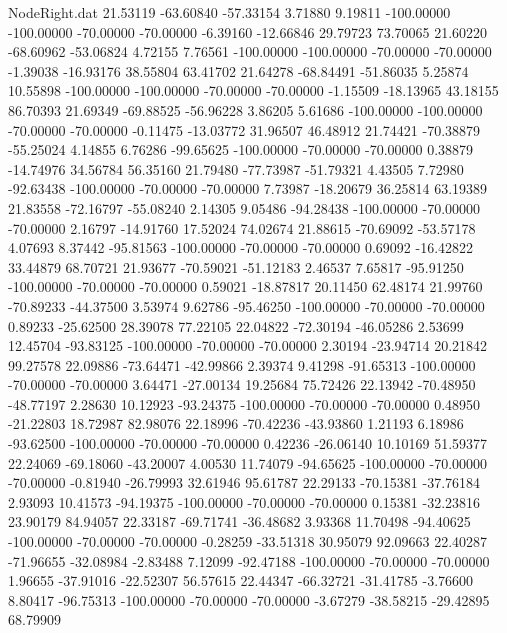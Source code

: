 \begin{filecontents}{NodeRight.dat}
  21.53119  -63.60840  -57.33154     3.71880    9.19811 -100.00000 -100.00000  -70.00000  -70.00000   -6.39160  -12.66846   29.79723   73.70065
  21.60220  -68.60962  -53.06824     4.72155    7.76561 -100.00000 -100.00000  -70.00000  -70.00000   -1.39038  -16.93176   38.55804   63.41702
  21.64278  -68.84491  -51.86035     5.25874   10.55898 -100.00000 -100.00000  -70.00000  -70.00000   -1.15509  -18.13965   43.18155   86.70393
  21.69349  -69.88525  -56.96228     3.86205    5.61686 -100.00000 -100.00000  -70.00000  -70.00000   -0.11475  -13.03772   31.96507   46.48912
  21.74421  -70.38879  -55.25024     4.14855    6.76286  -99.65625 -100.00000  -70.00000  -70.00000    0.38879  -14.74976   34.56784   56.35160
  21.79480  -77.73987  -51.79321     4.43505    7.72980  -92.63438 -100.00000  -70.00000  -70.00000    7.73987  -18.20679   36.25814   63.19389
  21.83558  -72.16797  -55.08240     2.14305    9.05486  -94.28438 -100.00000  -70.00000  -70.00000    2.16797  -14.91760   17.52024   74.02674
  21.88615  -70.69092  -53.57178     4.07693    8.37442  -95.81563 -100.00000  -70.00000  -70.00000    0.69092  -16.42822   33.44879   68.70721
  21.93677  -70.59021  -51.12183     2.46537    7.65817  -95.91250 -100.00000  -70.00000  -70.00000    0.59021  -18.87817   20.11450   62.48174
  21.99760  -70.89233  -44.37500     3.53974    9.62786  -95.46250 -100.00000  -70.00000  -70.00000    0.89233  -25.62500   28.39078   77.22105
  22.04822  -72.30194  -46.05286     2.53699   12.45704  -93.83125 -100.00000  -70.00000  -70.00000    2.30194  -23.94714   20.21842   99.27578
  22.09886  -73.64471  -42.99866     2.39374    9.41298  -91.65313 -100.00000  -70.00000  -70.00000    3.64471  -27.00134   19.25684   75.72426
  22.13942  -70.48950  -48.77197     2.28630   10.12923  -93.24375 -100.00000  -70.00000  -70.00000    0.48950  -21.22803   18.72987   82.98076
  22.18996  -70.42236  -43.93860     1.21193    6.18986  -93.62500 -100.00000  -70.00000  -70.00000    0.42236  -26.06140   10.10169   51.59377
  22.24069  -69.18060  -43.20007     4.00530   11.74079  -94.65625 -100.00000  -70.00000  -70.00000   -0.81940  -26.79993   32.61946   95.61787
  22.29133  -70.15381  -37.76184     2.93093   10.41573  -94.19375 -100.00000  -70.00000  -70.00000    0.15381  -32.23816   23.90179   84.94057
  22.33187  -69.71741  -36.48682     3.93368   11.70498  -94.40625 -100.00000  -70.00000  -70.00000   -0.28259  -33.51318   30.95079   92.09663
  22.40287  -71.96655  -32.08984    -2.83488    7.12099  -92.47188 -100.00000  -70.00000  -70.00000    1.96655  -37.91016  -22.52307   56.57615
  22.44347  -66.32721  -31.41785    -3.76600    8.80417  -96.75313 -100.00000  -70.00000  -70.00000   -3.67279  -38.58215  -29.42895   68.79909

\end{filecontents}
